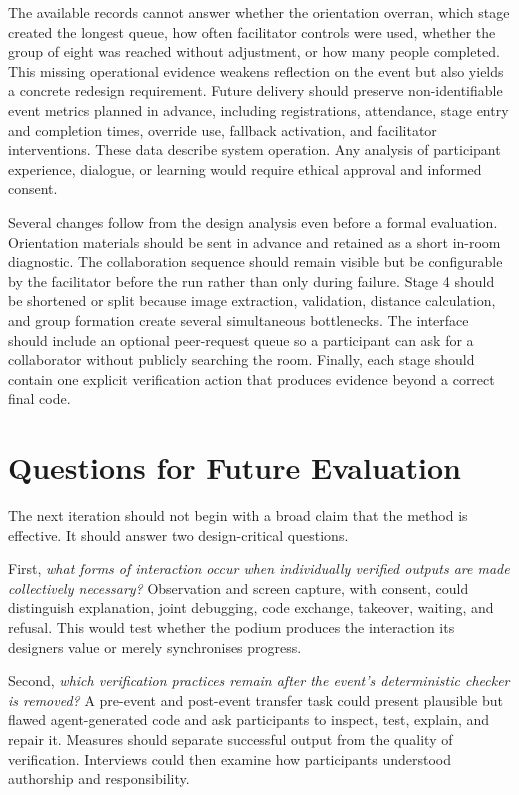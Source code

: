 \documentclass[11pt,a4paper]{article}
\begin{document}
The available records cannot answer whether the orientation overran, which stage created the longest queue, how often facilitator controls were used, whether the group of eight was reached without adjustment, or how many people completed. This missing operational evidence weakens reflection on the event but also yields a concrete redesign requirement. Future delivery should preserve non-identifiable event metrics planned in advance, including registrations, attendance, stage entry and completion times, override use, fallback activation, and facilitator interventions. These data describe system operation. Any analysis of participant experience, dialogue, or learning would require ethical approval and informed consent.

Several changes follow from the design analysis even before a formal evaluation. Orientation materials should be sent in advance and retained as a short in-room diagnostic. The collaboration sequence should remain visible but be configurable by the facilitator before the run rather than only during failure. Stage 4 should be shortened or split because image extraction, validation, distance calculation, and group formation create several simultaneous bottlenecks. The interface should include an optional peer-request queue so a participant can ask for a collaborator without publicly searching the room. Finally, each stage should contain one explicit verification action that produces evidence beyond a correct final code.

\section{Questions for Future Evaluation}

The next iteration should not begin with a broad claim that the method is effective. It should answer two design-critical questions.

First, \emph{what forms of interaction occur when individually verified outputs are made collectively necessary?} Observation and screen capture, with consent, could distinguish explanation, joint debugging, code exchange, takeover, waiting, and refusal. This would test whether the podium produces the interaction its designers value or merely synchronises progress.

Second, \emph{which verification practices remain after the event's deterministic checker is removed?} A pre-event and post-event transfer task could present plausible but flawed agent-generated code and ask participants to inspect, test, explain, and repair it. Measures should separate successful output from the quality of verification. Interviews could then examine how participants understood authorship and responsibility.
\end{document}
